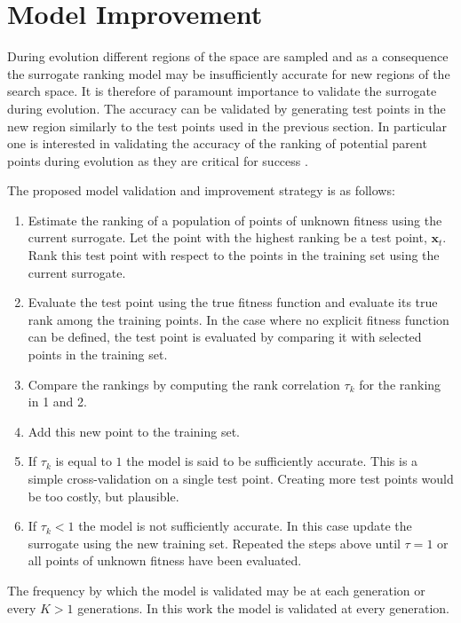 \documentclass[10pt]{llncs}
\renewcommand{\vec}[1]{{\mbox{\boldmath$#1$}}}
\renewcommand{\vec}[1]{{\mathbf #1}}
\begin{document}
\section{Model Improvement}\label{sec:MI}

During evolution different regions of the space are sampled and
as a consequence the surrogate ranking model may be
insufficiently accurate for new regions of the search space. It
is therefore of paramount importance to validate the surrogate
during evolution. The accuracy can be validated by generating
test points in the new region similarly to the test points used
in the previous section. In particular one is interested in
validating the accuracy of the ranking of potential parent
points during evolution as they are critical for success
\cite{Ru04:PPSN}.

The proposed model validation and improvement strategy is as
follows:
\begin{enumerate}
\item Estimate the ranking of a population of points of unknown
  fitness using the current surrogate. Let the point with the
  highest ranking be a test point, $\vec{x}_t$. Rank this test
  point with respect to the points in the training set using the
  current surrogate.
\item Evaluate the test point using the true fitness function
  and evaluate its true rank among the training points. In the
  case where no explicit fitness function can be defined, the
  test point is evaluated by comparing it with selected points
  in the training set.
\item Compare the rankings by computing the rank
  correlation $\tau_k$ for the ranking in 1 and 2.
\item Add this new point to the training set.
\item If $\tau_k$ is equal to $1$ the model is said to be
  sufficiently accurate. This is a simple cross-validation on a
  single test point. Creating more test points would be too
  costly, but plausible.
\item If $\tau_k < 1$ the model is not sufficiently accurate. In
  this case update the surrogate using the new training set.
  Repeated the steps above until $\tau=1$ or all points of
  unknown fitness have been evaluated.
\end{enumerate}
The frequency by which the model is validated may be at each
generation or every $K>1$ generations. In this work the model is
validated at every generation. 
\end{document}
